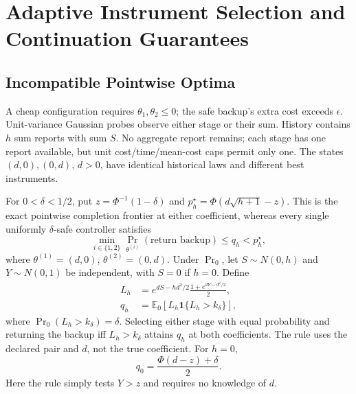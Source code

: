 \section{Adaptive Instrument Selection and Continuation Guarantees}
\label{app:adaptive-design}

\subsection{Incompatible Pointwise Optima}
\label{app:attainability-limit}

A cheap configuration requires $\theta_1,\theta_2\leq0$; the safe backup's extra cost exceeds $\epsilon$. Unit-variance Gaussian probes observe either stage or their sum. History contains $h$ sum reports with sum $S$. No aggregate report remains; each stage has one report available, but unit cost/time/mean-cost caps permit only one. The states $(d,0),(0,d)$, $d>0$, have identical historical laws and different best instruments.

\begin{proposition}
\label{prop:attainability-limit}
For $0<\delta<1/2$, put $z=\Phi^{-1}(1-\delta)$ and
$p_h^\star=\Phi(d\sqrt{h+1}-z)$. This is the exact pointwise completion
frontier at either coefficient, whereas every single uniformly
$\delta$-safe controller satisfies
\begin{equation}
 \min_{i\in\{1,2\}}\Pr_{\theta^{(i)}}(\text{return backup})
 \leq q_h<p_h^\star,
 \label{eq:attainment-gap}
\end{equation}
where $\theta^{(1)}=(d,0)$, $\theta^{(2)}=(0,d)$. Under $\Pr_0$, let
$S\sim N(0,h)$ and $Y\sim N(0,1)$ be independent, with $S=0$ if $h=0$.
Define
$$
 \begin{aligned}
 L_h&=e^{dS-hd^2/2}\frac{1+e^{dY-d^2/2}}2,\\
 q_h&=\mathbb E_0[L_h\mathbf1\{L_h>k_\delta\}],
 \end{aligned}
$$
where $\Pr_0(L_h>k_\delta)=\delta$. Selecting either stage with equal
probability and returning the backup iff $L_h>k_\delta$ attains $q_h$
at both coefficients. The rule uses the declared pair and $d$, not the
true coefficient. For $h=0$,
\begin{equation}
 q_0=\frac{\Phi(d-z)+\delta}{2}.
 \label{eq:attainment-gap-no-history}
\end{equation}
Here the rule simply tests $Y>z$ and requires no knowledge of $d$.
\end{proposition}

